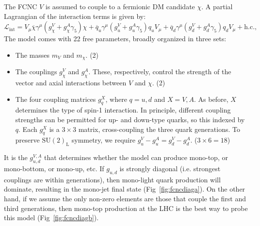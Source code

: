 The FCNC $V$ is assumed to couple to a fermionic DM candidate $\chi$. 
A partial Lagrangian of the interaction terms is given by:
\begin{equation}
\mathcal{L}_\text{int}=  V_\mu  \overline\chi \gamma^\mu (  g^V_{\chi} + g^A_{\chi} \gamma_5 ) \chi
                           + \overline{q}_u \gamma^\mu
                           ( g^V_u + g^A_u \gamma_5 ) q_u V_\mu
                           + \overline{q}_{d} \gamma^\mu
                           (  g^V_{d} + g^A_{d} \gamma_5 ) q_d V_\mu
                           + \text{h.c.},
    \label{eq:Lfcnc}
\end{equation}
The model comes with 22 free parameters, broadly organized in three sets:
\begin{itemize}
    \item The masses $m_V$ and $m_\chi$. (2)
    \item The couplings $g_\chi^V$ and $g_\chi^A$. These, respectively, control the strength of the vector and axial interactions between $V$ and $\chi$. (2)
    \item The four coupling matrices $g_{q}^{X}$, where $q=u,d$ and $X=V,A$. 
          As before, $X$ determines the type of spin-1 interaction. 
          In principle, different coupling strengths can be permitted for up- and down-type quarks, so this indexed by $q$. 
          Each $g_{q}^{X}$ is a $3\times3$ matrix, cross-coupling the three quark generations. 
          To preserve $\mathrm{SU}(2)_\mathrm{L}$ symmetry, we require $g_u^V - g_u^A = g_d^V - g_d^A$. ($3\times6=18$)
\end{itemize}

It is the $g_{u,d}^{V,A}$ that determines whether the model can produce mono-top, or mono-bottom, or mono-up, etc. 
If $g_{u,d}$ is strongly diagonal (i.e. strongest couplings are within generations), then mono-light quark production will dominate, resulting in the mono-jet final state (Fig~\ref{fig:fcncdiaga}).
On the other hand, if we assume the only non-zero elements are those that couple the first and third generations, then mono-top production at the LHC is the best way to probe this model (Fig~\ref{fig:fcncdiagb}).

